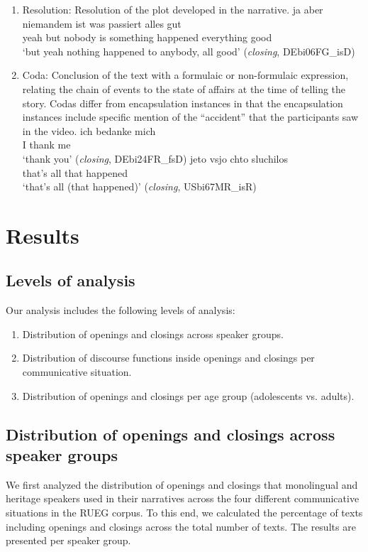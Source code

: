 \documentclass[output=paper,colorlinks,citecolor=brown]{langscibook}
\begin{document}
\begin{enumerate}[label=(\alph*)]
\item Resolution: Resolution of the plot developed in the narrative. 
    \ea \label{katsikaetal:twentysixresolution}
\gll ja   aber niemandem ist was       passiert alles      gut \\
     yeah but  nobody    is  something happened everything good\\
\glt `but yeah nothing happened to anybody, all good' (\textit{closing}, DEbi06FG\_isD)
\z

\item Coda: Conclusion of the text with a formulaic or non-formulaic expression, relating the chain of events to the state of affairs at the time of telling the story. Codas differ from encapsulation instances in that the encapsulation instances include specific mention of the “accident” that the participants saw in the video. 
    \ea \label{katsikaetal:twentysevencoda}
\gll ich bedanke mich\\
     I   thank   me\\
\glt `thank you' (\textit{closing}, DEbi24FR\_fsD)
\ex \label{katsikaetal:twentyeightcoda}
\gll jeto vsjo chto sluchilos\\
     that's all that happened\\
\glt `that’s all (that happened)' (\textit{closing}, USbi67MR\_isR)
\z
\end{enumerate}

\section{Results}
\subsection{Levels of analysis}
Our analysis includes the following levels of analysis:

\begin{enumerate}[label=(\alph*)]
    \item Distribution of openings and closings across speaker groups. 
    \item Distribution of discourse functions inside openings and closings per communicative situation.
    \item Distribution of openings and closings per age group (adolescents vs. adults).
\end{enumerate}

\subsection{Distribution of openings and closings across speaker groups} \label{sec:katsikaetal:openingsclosingsgeneral}
We first analyzed the distribution of openings and closings that monolingual and heritage speakers used in their narratives across the four different communicative situations in the RUEG corpus. To this end, we calculated the percentage of texts including openings and closings across the total number of texts. The results are presented per speaker group. 
\end{document}
